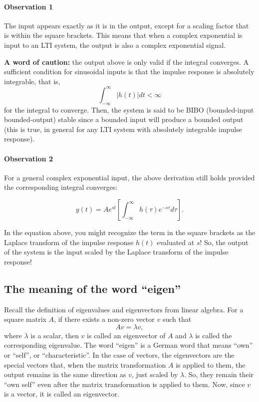 \paragraph{Observation 1} The input appears exactly as it is in the output, except for a scaling factor that is within the square brackets. This means that when a complex exponential is input to an LTI system, the output is also a complex exponential signal.

\textbf{A word of caution:} the output above is only valid if the integral converges. A sufficient condition for sinusoidal inputs is that the impulse response is absolutely integrable, that is,
\[\int_{-\infty}^{\infty} |h(t)| dt < \infty\] for the integral to converge. Then, the system is said to be BIBO (bounded-input bounded-output) stable since a bounded input will produce a bounded output (this is true, in general for any LTI system with absolutely integrable impulse response).

\paragraph{Observation 2} For a general complex exponential input, the above derivation still holds provided the corresponding integral converges:

\[
y(t) = A e^{st} \left[\int_{-\infty}^{\infty} h(\tau) e^{-s \tau} d\tau\right].
\]

In the equation above, you might recognize the term in the square brackets as the Laplace transform of the impulse response \(h(t)\) evaluated at \(s\)! So, the output of the system is the input scaled by the Laplace transform of the impulse response!


\subsection{The meaning of the word ``eigen''}
Recall the definition of eigenvalues and eigenvectors from linear algebra. For a square matrix \(A\), if there exists a non-zero vector \(v\) such that
\[
Av = \lambda v,
\]
where \(\lambda\) is a scalar, then \(v\) is called an eigenvector of \(A\) and \(\lambda\) is called the corresponding eigenvalue. The word ``eigen'' is a German word that means ``own'' or ``self'', or ``characteristic''. In the case of vectors, the eigenvectors are the special vectors that, when the matrix transformation $A$ is applied to them, the output remains in the same direction as $v$, just scaled by $\lambda$. So, they remain their ``own self'' even after the matrix transformation is applied to them. Now, since $v$ is a vector, it is called an eigenvector.

